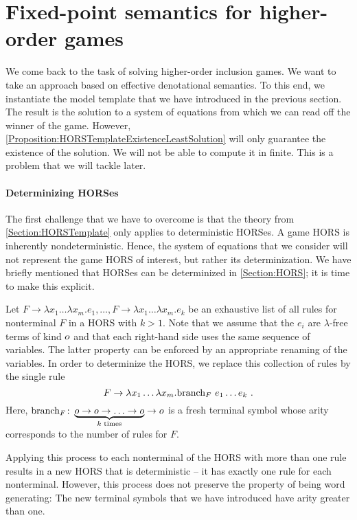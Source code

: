 \documentclass[../../diss.tex]{subfiles}
\begin{document}
\section{Fixed-point semantics for higher-order games}%
\label{Section:HORSFPSemantics}%

We come back to the task of solving higher-order inclusion games.
We want to take an approach based on effective denotational semantics.
To this end, we instantiate the model template that we have introduced in the previous section.
The result is the solution to a system of equations from which we can read off the winner of the game.
However, \cref{Proposition:HORSTemplateExistenceLeastSolution} will only guarantee the existence of the solution.
We will not be able to compute it in finite.
This is a problem that we will tackle later.

\paragraph{Determinizing HORSes}

The first challenge that we have to overcome is that the theory from \cref{Section:HORSTemplate} only applies to deterministic HORSes.
A game HORS is inherently nondeterministic.
Hence, the system of equations that we consider will not represent the game HORS of interest, but rather its determinization.
We have briefly mentioned that HORSes can be determinized in \cref{Section:HORS}; it is time to make this explicit.

Let $F \to \lambda x_1 \ldots \lambda x_m . e_1, \ldots, F \to \lambda x_1 \ldots \lambda x_m . e_k$ be an exhaustive list of all rules for nonterminal $F$ in a HORS with $k > 1$.
Note that we assume that the $e_i$ are $\lambda$-free terms of kind $o$ and that each right-hand side uses the same sequence of variables.
The latter property can be enforced by an appropriate renaming of the variables.
In order to determinize the HORS, we replace this collection of rules by the single rule
\[
    F \to \lambda x_1 \ldots \lambda x_m . \text{branch}_F\ e_1 \ldots e_k
    \ .
\]
Here, $\brancht_F \colon \underbrace{\ground \to \ground \to \ldots \to \ground}_{k \text{ times}} \to \ground$ is a fresh terminal symbol whose arity corresponds to the number of rules for $F$.

Applying this process to each nonterminal of the HORS with more than one rule results in a new HORS that is deterministic -- it has exactly one rule for each nonterminal.
However, this process does not preserve the property of being word generating:
The new terminal symbols that we have introduced have arity greater than one.
\end{document}
